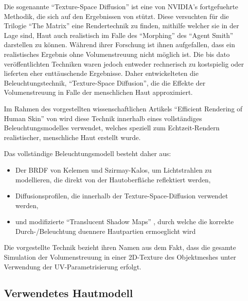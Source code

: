 \documentclass[ngerman,runningheads,a4paper]{llncs}[2018/03/10]
\begin{document}
Die sogenannte \enquote{Texture-Space Diffusion} ist eine von NVIDIA's \citet{efficient-human-skin-rendering} fortgefuehrte Methodik, die sich auf den Ergebnissen von \citet{realistic-human-face-rendering-matrix} stützt.
Diese versuchten für die Trilogie \enquote{The Matrix} eine Rendertechnik zu finden, mithilfe welcher sie in der Lage sind, Haut auch realistisch  im Falle des \enquote{Morphing} des \enquote{Agent Smith} darstellen zu können.
Während ihrer Forschung ist ihnen aufgefallen, dass ein realistisches Ergebnis ohne Volumenstreuung nicht möglich ist.
Die bis dato veröffentlichten Techniken waren jedoch entweder rechnerisch zu kostspielig oder lieferten eher enttäuschende Ergebnisse.
Daher entwickelteten \citet{realistic-human-face-rendering-matrix} die Beleuchtungstechnik, \enquote{Texture-Space Diffusion}, die die Effekte der Volumenstreuung in Falle der menschlichen Haut approximiert.

Im Rahmen des vorgestellten wissenschaftlichen Artikels \enquote{Efficient Rendering of Human Skin} von \citet{advanced-realtime-skin-rendering} wird diese Technik innerhalb eines vollständiges Beleuchtungsmodelles verwendet, welches speziell zum Echtzeit-Rendern realistischer, menschliche Haut erstellt wurde.

Das vollständige Beleuchtungsmodell besteht daher aus:

\begin{itemize}
  \item Der BRDF von Kelemen und Szirmay-Kalos, um Lichtstrahlen zu modellieren, die direkt von der Hautoberfläche reflektiert werden,
  \item Diffusionsprofilen, die innerhalb der Texture-Space-Diffusion verwendet werden,
  \item und modifizierte \enquote{Translucent Shadow Maps} \citep{translucent-shadow-maps}, durch welche die korrekte Durch-/Beleuchtung duennere Hautpartien ermoeglicht wird
\end{itemize}

Die vorgestellte Technik bezieht ihren Namen aus dem Fakt, dass die gesamte Simulation der Volumenstreuung in einer 2D-Texture des Objektmeshes unter Verwendung der UV-Parametrisierung erfolgt.

\subsection{Verwendetes Hautmodell}
\label{sub:skin-model}
\end{document}

